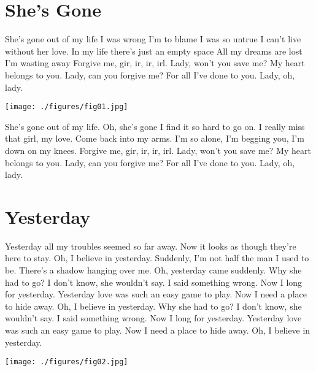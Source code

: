 \documentclass{gshs_poster_rpt}
\begin{document}
\begin{multicols}{3}
\section*{She's Gone}
She's gone out of my life I was wrong I'm to blame I was so untrue I can't live without her love. In my life there's just an empty space All my dreams are lost I'm wasting away Forgive me, gir, ir, ir, irl. Lady, won't you save me? My heart belongs to you. Lady, can you forgive me? For all I've done to you. Lady, oh, lady.
\begin{center}\vspace{1cm}
\texttt{[image: ./figures/fig01.jpg]}
\end{center}
She's gone out of my life. Oh, she's gone I find it so hard to go on. I really miss that girl, my love. Come back into my arms. I'm so alone, I'm begging you, I'm down on my knees. Forgive me, gir, ir, ir, irl. Lady, won't you save me? My heart belongs to you. Lady, can you forgive me? For all I've done to you. Lady, oh, lady.

\section*{Yesterday}
Yesterday all my troubles seemed so far away. Now it looks as though they're here to stay. Oh, I believe in yesterday. Suddenly, I'm not half the man I used to be.
There's a shadow hanging over me.
Oh, yesterday came suddenly. Why she had to go?
I don't know, she wouldn't say.
I said something wrong.
Now I long for yesterday. Yesterday love was such an easy game to play.
Now I need a place to hide away.
Oh, I believe in yesterday. Why she had to go?
I don't know, she wouldn't say.
I said something wrong.
Now I long for yesterday. Yesterday love was such an easy game to play.
Now I need a place to hide away.
Oh, I believe in yesterday.
\begin{center}
\texttt{[image: ./figures/fig02.jpg]}
\end{center}


\end{multicols}
\end{document}
